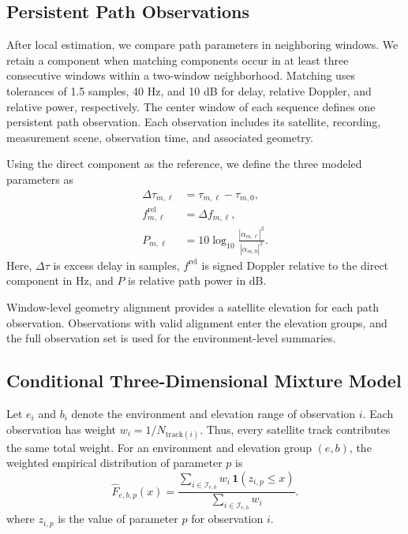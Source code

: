 \documentclass[conference]{IEEEtran}
\begin{document}
\subsection{Persistent Path Observations}
After local estimation, we compare path parameters in neighboring windows. We retain a component when matching components occur in at least three consecutive windows within a two-window neighborhood. Matching uses tolerances of 1.5 samples, 40 Hz, and 10 dB for delay, relative Doppler, and relative power, respectively. The center window of each sequence defines one persistent path observation. Each observation includes its satellite, recording, measurement scene, observation time, and associated geometry.

Using the direct component as the reference, we define the three modeled parameters as
\begin{equation}
\begin{aligned}
\Delta\tau_{m,\ell}&=\tau_{m,\ell}-\tau_{m,0},\\
f^{\mathrm{rel}}_{m,\ell}&=\Delta f_{m,\ell},\\
P_{m,\ell}&=10\log_{10}\!\frac{|\alpha_{m,\ell}|^2}{|\alpha_{m,0}|^2}.
\end{aligned}
\label{eq:path-parameters}
\end{equation}
Here, $\Delta\tau$ is excess delay in samples, $f^{\mathrm{rel}}$ is signed Doppler relative to the direct component in Hz, and $P$ is relative path power in dB.

Window-level geometry alignment provides a satellite elevation for each path observation. Observations with valid alignment enter the elevation groups, and the full observation set is used for the environment-level summaries.

\subsection{Conditional Three-Dimensional Mixture Model}
Let $e_i$ and $b_i$ denote the environment and elevation range of observation $i$. Each observation has weight $w_i=1/N_{\mathrm{track}(i)}$. Thus, every satellite track contributes the same total weight. For an environment and elevation group $(e,b)$, the weighted empirical distribution of parameter $p$ is
\begin{equation}
\widehat F_{e,b,p}(x)=
\frac{\sum_{i\in\mathcal I_{e,b}}w_i\,\mathbf{1}(z_{i,p}\le x)}
{\sum_{i\in\mathcal I_{e,b}}w_i}.
\label{eq:weighted-cdf}
\end{equation}
where $z_{i,p}$ is the value of parameter $p$ for observation $i$.
\end{document}
